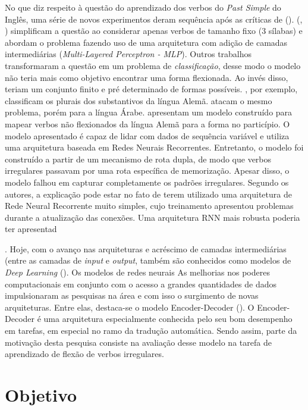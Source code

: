 No que diz respeito à questão do aprendizado dos verbos do \textit{Past Simple} do Inglês, uma série de novos experimentos deram sequência após as críticas de (\cite{Pinker:1988}). (\cite{pluket:1991}, \citeyear{PLUNKETT:1993}) simplificam a questão ao considerar apenas verbos de tamanho fixo (3 sílabas) e abordam o problema fazendo uso de uma arquitetura com adição de camadas intermediárias (\textit{Multi-Layered Perceptron - MLP}). Outros trabalhos transformaram a questão em um problema de \textit{classificação}, desse modo o modelo não teria mais como objetivo encontrar uma forma flexionada. Ao invés disso, teriam um conjunto finito e pré determinado de formas possíveis. \cite{Nakisa1996WhereDD}, por exemplo, classificam os plurais dos substantivos da língua Alemã. \cite{plunkett:1997} atacam o mesmo problema, porém para a língua Árabe. \cite{wetermann:1997} apresentam um modelo construído para mapear verbos não flexionados da língua Alemã para a forma no particípio. O modelo apresentado é capaz de lidar com dados de sequência variável e utiliza uma arquitetura baseada em Redes Neurais Recorrentes. Entretanto, o modelo foi construído a partir de um mecanismo de rota dupla, de modo que verbos irregulares passavam por uma rota específica de memorização. Apesar disso, o modelo falhou em capturar completamente os padrões irregulares. Segundo os autores, a explicação pode estar no fato de terem utilizado uma arquitetura de Rede Neural Recorrente muito simples, cujo treinamento apresentou problemas durante a atualização das conexões. Uma arquitetura RNN mais robusta poderia ter apresentad  


. Hoje, com o avanço nas arquiteturas e acréscimo de camadas intermediárias (entre as camadas de \textit{input} e \textit{output}, também são conhecidos como modelos de \textit{Deep Learning} (\cite{Goodfellow-et-al-2016}). Os modelos de redes neurais 
As melhorias nos poderes computacionais em conjunto com o acesso a grandes quantidades de dados impulsionaram as pesquisas na área e com isso o surgimento de novas arquiteturas. Entre elas, destaca-se o modelo Encoder-Decoder (\cite{enc-dec:2014}). O Encoder-Decoder é uma arquitetura especialmente conhecida pelo seu bom desempenho em tarefas, em especial no ramo da tradução automática. Sendo assim, parte da motivação desta pesquisa consiste na avaliação desse modelo na tarefa de aprendizado de flexão de verbos irregulares. 


\section{Objetivo}
\label{sec:objectives}

